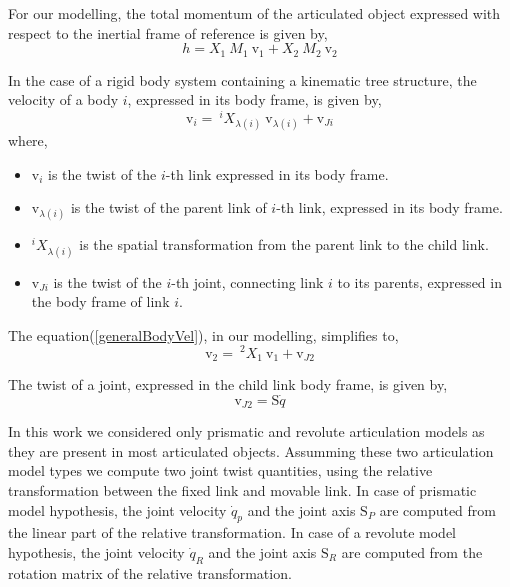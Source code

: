 \documentclass[12pt,a4paper]{report}
\begin{document}
For our modelling, the total momentum of the articulated object expressed with respect to the inertial frame of reference is given by,
\begin{equation}
  h =  X_1 \ M_1 \ \mathrm{v}_1 + X_2 \ M_2 \ \mathrm{v}_2
 \label{totalMom}
\end{equation}

In the case of a rigid body system containing a kinematic tree structure, the velocity of a body $i$, expressed in its body frame, is given by,
\begin{equation}
  \mathrm{v}_i = \  ^iX_{\lambda(i)} \ \mathrm{v}_{\lambda(i)} + \mathrm{v}_{Ji}
  \label{generalBodyVel}
\end{equation}
where,
  \begin{itemize}
    \item $\mathrm{v}_i$ is the twist of the $i$-th link expressed in its body frame.
    \item $\mathrm{v}_{\lambda(i)}$ is the twist of the parent link of $i$-th link, expressed in its body frame. 
    \item $^iX_{\lambda(i)}$ is the spatial transformation from the parent link to the child link.
    \item $\mathrm{v}_{Ji}$ is the twist of the $i$-th joint, connecting link $i$ to its parents, expressed in the body frame of link $i$.
  \end{itemize}
   
  The equation(\ref{generalBodyVel}), in our modelling, simplifies to,
  \begin{equation}
    \mathrm{v}_2 = \  ^2X_{1} \ \mathrm{v}_{1} + \mathrm{v}_{J2}
  \label{bodyVel}
  \end{equation} 
  
   The twist of a joint, expressed in the child link body frame, is given by,
  \begin{equation}
    \mathrm{v}_{J2} = \mathrm{S}\dot{q}
    \label{jointVel}
  \end{equation}
  
  In this work we considered only prismatic and revolute articulation models as they are present in most articulated objects. Assumming these two articulation model types we compute two joint twist quantities, using the relative transformation between the fixed link and movable link. In case of prismatic model hypothesis, the joint velocity $\dot{q}_p$ and the joint axis $\mathrm{S}_P$ are computed from the linear part of the relative transformation. In case of a revolute model hypothesis, the joint velocity $\dot{q}_R$ and the joint axis $\mathrm{S}_R$ are computed from the rotation matrix of the relative transformation. 
  
\end{document}
